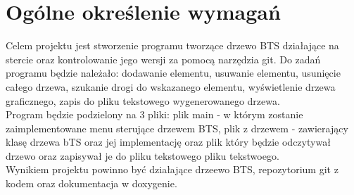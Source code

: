	\newpage
\section{Ogólne określenie wymagań}		%

\hspace{0.60cm}

Celem projektu jest stworzenie programu tworzące drzewo BTS działające na stercie oraz kontrolowanie jego wersji za pomocą narzędzia git. Do zadań programu będzie należało: dodawanie elementu, usuwanie elementu, usunięcie całego drzewa, szukanie drogi do wskazanego elementu, wyświetlenie drzewa graficznego, zapis do pliku tekstowego wygenerowanego drzewa. 
\\
Program będzie podzielony na 3 pliki: plik main - w którym zostanie zaimplementowane menu sterujące drzewem BTS, plik z drzewem - zawierający klasę drzewa bTS oraz jej implementację oraz plik który będzie odczytywał drzewo oraz zapisywał je do pliku tekstowego pliku tekstwoego.
\\
Wynikiem projektu powinno być działające drzeewo BTS, repozytorium git z kodem oraz dokumentacja w doxygenie.

